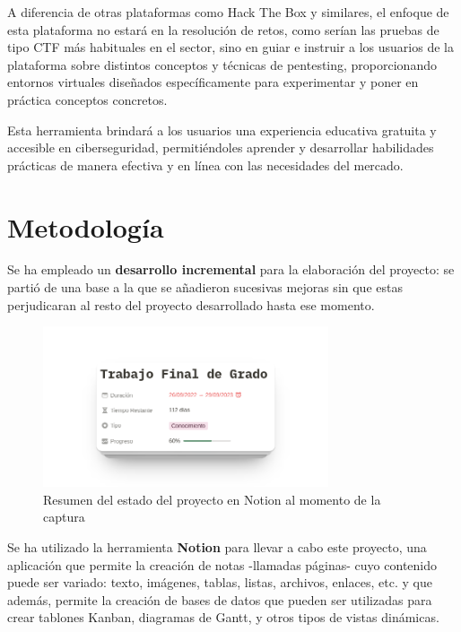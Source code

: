         A diferencia de otras plataformas como Hack The Box y similares, el enfoque de esta plataforma no estará en la resolución de retos, como serían las pruebas de tipo CTF más habituales en el sector, sino en guiar e instruir a los usuarios de la plataforma sobre distintos conceptos y técnicas de pentesting, proporcionando entornos virtuales diseñados específicamente para experimentar y poner en práctica conceptos concretos.
        
        Esta herramienta brindará a los usuarios una experiencia educativa gratuita y accesible en ciberseguridad, permitiéndoles aprender y desarrollar habilidades prácticas de manera efectiva y en línea con las necesidades del mercado.
    
    
    \section{Metodología}
    
        Se ha empleado un \textbf{desarrollo incremental} para la elaboración del proyecto: se partió de una base a la que se añadieron sucesivas mejoras sin que estas perjudicaran al resto del proyecto desarrollado hasta ese momento.

        \begin{figure}[htbp]
            \centering

            \includegraphics[width=0.75\textwidth]{images/Capturas/Notion resumen.png}
            \caption{Resumen del estado del proyecto en Notion al momento de la captura}
            \label{fig:notion-resumen}
        \end{figure}

        Se ha utilizado la herramienta \textbf{Notion} para llevar a cabo este proyecto, una aplicación que permite la creación de notas -llamadas páginas- cuyo contenido puede ser variado: texto, imágenes, tablas, listas, archivos, enlaces, etc. y que además, permite la creación de bases de datos que pueden ser utilizadas para crear tablones Kanban, diagramas de Gantt, y otros tipos de vistas dinámicas.

